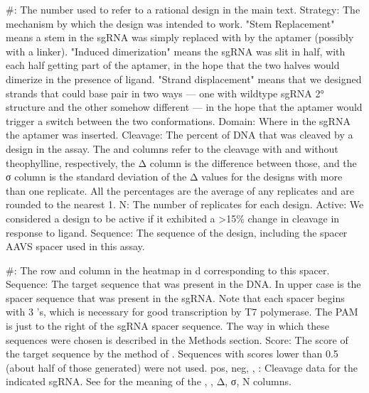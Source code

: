 \documentclass[10pt,oneside]{article}
\begin{document}
    \#: The number used to refer to a rational design in the main text.
    Strategy: The mechanism by which the design was intended to work.  "Stem Replacement" means a stem in the sgRNA was simply replaced with by the aptamer (possibly with a linker).  "Induced dimerization" means the sgRNA was slit in half, with each half getting part of the aptamer, in the hope that the two halves would dimerize in the presence of ligand.  "Strand displacement" means that we designed strands that could base pair in two ways --- one with wildtype sgRNA 2° structure and the other somehow different --- in the hope that the aptamer would trigger a switch between the two conformations.
    Domain: Where in the sgRNA the aptamer was inserted.
    Cleavage: The percent of DNA that was cleaved by a design in the \invitro{} assay.  The \apo{} and \holo{} columns refer to the cleavage with and without theophylline, respectively, the Δ column is the difference between those, and the σ column is the standard deviation of the Δ values for the designs with more than one replicate.  All the percentages are the average of any replicates and are rounded to the nearest 1.
    N: The number of replicates for each design.
    Active: We considered a design to be active if it exhibited a >15\% change in cleavage in response to ligand.  
% 
% 
    Sequence: The sequence of the design, including the spacer AAVS spacer used in this assay.



    \#: The row and column in the heatmap in d corresponding to this spacer.
    Sequence: The  target sequence that was present in the DNA.  In upper case is the  spacer sequence that was present in the sgRNA.  Note that each spacer begins with 3 's, which is necessary for good transcription by T7 polymerase.  The  PAM is just to the right of the sgRNA spacer sequence.  The way in which these sequences were chosen is described in the Methods section.
    Score: The score of the target sequence by the method of .  Sequences with scores lower than 0.5 (about half of those generated) were not used.
    pos, neg, \ligrnaF{}, \ligrnaB{}: Cleavage data for the indicated sgRNA.  See  for the meaning of the \apo{}, \holo{}, Δ, σ, N columns.
\end{document}
